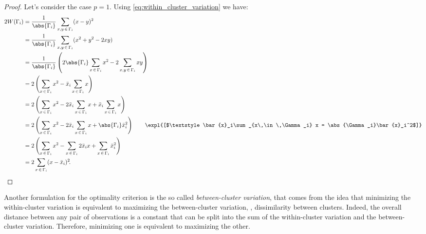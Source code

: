 \begin{proof}
    Let's consider the case $p = 1$. Using \eqref{eq:within_cluster_variation} we have:
    \begin{equation}
        \begin{aligned}
            2W(\Gamma_i) & = \frac{1}{\abs{\Gamma_i}} \sum_{x, y\,\in\,\Gamma_i} (x - y)^2                                                                                                                                                   \\
                         & = \frac{1}{\abs{\Gamma_i}} \sum_{x, y\,\in\,\Gamma_i} (x^2 + y^2 - 2xy)                                                                                                                                           \\
                         & = \frac{1}{\abs{\Gamma_i}} \left( 2\abs{\Gamma_i} \sum_{x\,\in\,\Gamma_i} x^2 - 2\sum_{x, y\,\in\,\Gamma_i} xy \right)                                                                                              \\
                         & = 2\left(\sum_{x\,\in\,\Gamma_i} x^2 - \bar{x}_i\sum_{x\,\in\,\Gamma_i} x\right)                                                                                                                                    \\
                         & = 2\left(\sum_{x\,\in\,\Gamma_i} x^2 -2 \bar{x}_i\sum_{x\,\in\,\Gamma_i} x + \bar{x}_i\sum_{x\,\in\,\Gamma_i} x \right)                                                                                               \\
                         & = 2\left(\sum_{x\,\in\,\Gamma_i} x^2 - 2\bar{x}_i\sum_{x\,\in\,\Gamma_i} x + \abs{\Gamma_i}\bar{x}_i^2\right) \qquad \expl{[$\textstyle\bar{x}_i\sum_{x\,\in\,\Gamma_i} x = \abs{\Gamma_i}\bar{x}_i^2$]} \\
                         & = 2\left(\sum_{x\,\in\,\Gamma_i} x^2 - \sum_{x\,\in\,\Gamma_i}2\bar{x}_i x + \sum_{x\,\in\,\Gamma_i}\bar{x}_i^2\right)\\
                         & = 2\sum_{x\,\in\,\Gamma_i} (x - \bar{x}_i)^2\negthinspace.
        \end{aligned}
        \vspace{-1.5em}
    \end{equation}
\end{proof}

Another formulation for the optimality criterion is the so called \emph{between-cluster variation}, that comes from the idea that minimizing the within-cluster variation is equivalent to maximizing the between-cluster variation, \ie, dissimilarity between clusters. Indeed, the overall distance between any pair of observations is a constant that can be split into the sum of the within-cluster variation and the between-cluster variation. Therefore, minimizing one is equivalent to maximizing the other.

